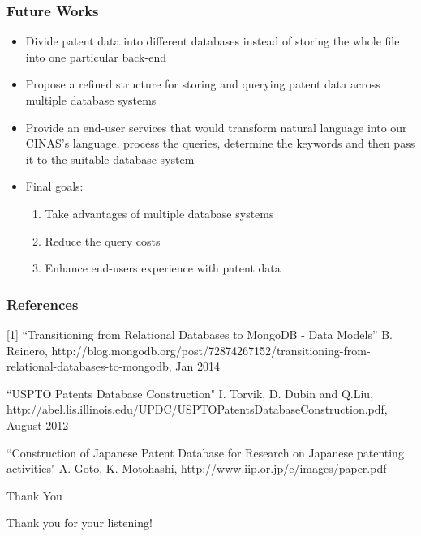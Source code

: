 \documentclass{beamer}
\begin{document}
\begin{frame}
\frametitle{Future Works}
\begin{itemize}
\item Divide patent data into different databases instead of storing the whole file into one particular back-end
\item Propose a refined structure for storing and querying patent data across multiple database systems
\item Provide an end-user services that would transform natural language into our CINAS's language, process the queries, determine the keywords and then pass it to the suitable database system
\item Final goals:
\begin{enumerate}
\item Take advantages of multiple database systems
\item Reduce the query costs
\item Enhance end-users experience with patent data
\end{enumerate}
\end{itemize}
\end{frame}

\begin{frame}
\frametitle{References}
[1] ``Transitioning from Relational Databases to MongoDB - Data Models'' B. Reinero, http://blog.mongodb.org/post/72874267152/transitioning-from-relational-databases-to-mongodb, Jan 2014\par
[2] ``USPTO Patents Database Construction" I. Torvik, D. Dubin and Q.Liu, http://abel.lis.illinois.edu/UPDC/USPTOPatentsDatabaseConstruction.pdf, August 2012\par
[3] ``Construction of Japanese Patent Database for Research on Japanese patenting activities" A. Goto, K. Motohashi, http://www.iip.or.jp/e/images/paper.pdf
\end{frame}

\begin{frame}{Thank You}
\begin{center}
Thank you for your listening!
\end{center}
\end{frame}
\end{document}
